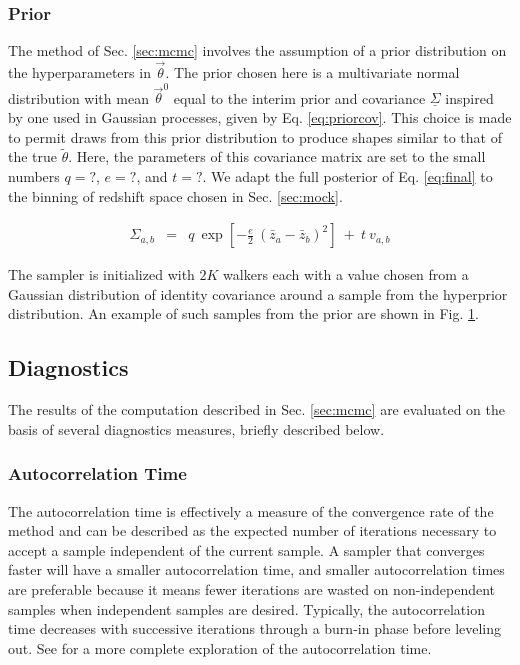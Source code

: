 \documentclass[preprint]{aastex}
\newcommand{\textul}{\underline}
\begin{document}
\clearpage
\subsubsection{Prior}
\label{sec:prior}

The method of Sec. \ref{sec:mcmc} involves the assumption of a prior 
distribution on the hyperparameters in $\vec{\theta}$.  The prior chosen here 
is a multivariate normal distribution with mean $\vec{\theta}^{0}$ equal to the 
interim prior and covariance $\textul{\Sigma}$ inspired by one used in Gaussian 
processes, given by Eq. \ref{eq:priorcov}.  This choice is made to permit draws 
from this prior distribution to produce shapes similar to that of the true 
$\tilde{\theta}$.  Here, the parameters of this covariance matrix are set to 
the small numbers $q=?$, $e=?$, and $t=?$.  We adapt the full posterior of Eq. 
\ref{eq:final} to the binning of redshift space chosen in Sec. \ref{sec:mock}.

\begin{eqnarray}
\label{eq:priorcov}
\Sigma_{a,b} &=& q\ \exp[-\frac{e}{2}\ (\bar{z}_{a}-\bar{z}_{b})^{2}]\ +\ t\ 
v_{a,b}
\end{eqnarray}

The sampler is initialized with $2K$ walkers each with a value chosen from a 
Gaussian distribution of identity covariance around a sample from the 
hyperprior distribution.  An example of such samples from the prior are shown 
in Fig. \ref{fig:nullprior}.

\begin{figure}
\caption{}
\label{fig:nullprior}
\end{figure}

\clearpage
\subsection{Diagnostics}
\label{sec:diag}

The results of the computation described in Sec. \ref{sec:mcmc} are evaluated 
on the basis of several diagnostics measures, briefly described below.

\subsubsection{Autocorrelation Time}
\label{sec:acorr}

The autocorrelation time is effectively a measure of the convergence rate of 
the method and can be described as the expected number of iterations necessary 
to accept a sample independent of the current sample.  A sampler that converges 
faster will have a smaller autocorrelation time, and smaller autocorrelation 
times are preferable because it means fewer iterations are wasted on 
non-independent samples when independent samples are desired.  Typically, the 
autocorrelation time decreases with successive iterations through a burn-in 
phase before leveling out.  See \citet{Foreman-Mackey2013} for a more complete 
exploration of the autocorrelation time.
\end{document}
